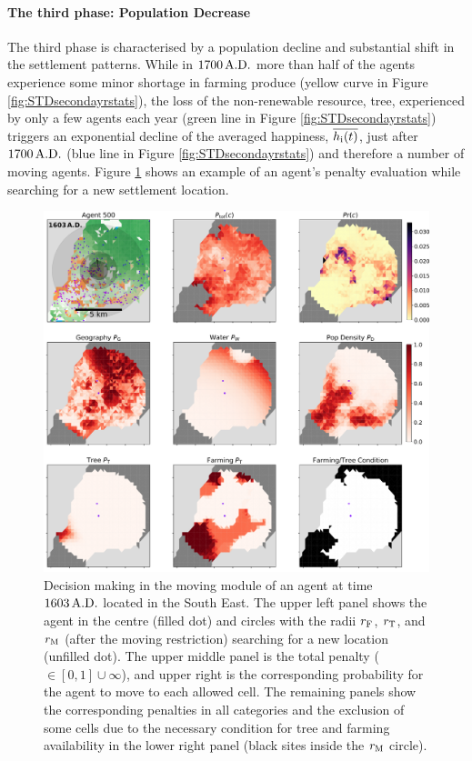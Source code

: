 \paragraph{The third phase: Population Decrease}
The third phase is characterised by a population decline and substantial shift in the settlement patterns.
While in $1700\,{\rm A.D.}$ more than half of the agents experience some minor shortage in farming produce (yellow curve in Figure \ref{fig:STDsecondayrstats}), 
the loss of the non-renewable resource, tree, experienced by only a few agents each year (green line in Figure \ref{fig:STDsecondayrstats}) triggers an exponential decline of the averaged happiness, $\overline{h_{\rm i}(t)}$, just after $1700\, {\rm A.D.}$ (blue line in Figure \ref{fig:STDsecondayrstats}) and therefore a number of moving agents.
Figure \ref{fig:penaltiesag500t1603} shows an example of an agent's penalty evaluation while searching for a new settlement location.
\begin{figure}
	\centering
	\includegraphics[width=1.3\linewidth, center]{images/Results/Standard/Penalties_AG500_t=1603}
	\caption{Decision making in the moving module of an agent at time $1603\, {\rm A.D.}$ located in the South East. The upper left panel shows the agent in the centre (filled dot) and circles with the radii $r_{\rm F}$, $r_{\rm T}$, and $r_{\rm M}$ (after the moving restriction) searching for a new location (unfilled dot). The upper middle panel is the total penalty ($\in [0,1]\cup \infty$), and upper right is the corresponding probability for the agent to move to each allowed cell. The remaining panels show the corresponding penalties in all categories and the exclusion of some cells due to the necessary condition for tree and farming availability in the lower right panel (black sites inside the $r_{\rm M}$ circle).}
	\label{fig:penaltiesag500t1603}
\end{figure}
